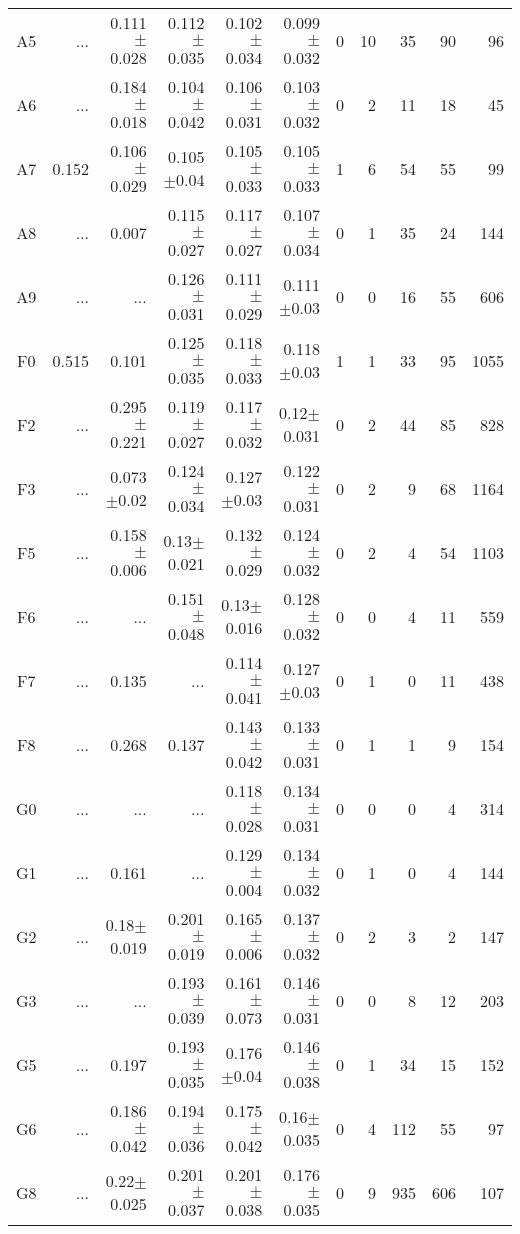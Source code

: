 \begin{table}[t]
\begin{center}
\begin{tabular}{c|rrrrr|rrrrr}
A5	&	 ...	&	0.111$\pm$0.028	&	0.112$\pm$0.035	&	0.102$\pm$0.034	&	0.099$\pm$0.032	&	0	&	10	&	35	&	90	&	96	\\
A6	&	 ...	&	0.184$\pm$0.018	&	0.104$\pm$0.042	&	0.106$\pm$0.031	&	0.103$\pm$0.032	&	0	&	2	&	11	&	18	&	45	\\
A7	&	0.152	&	0.106$\pm$0.029	&	0.105$\pm$0.04	&	0.105$\pm$0.033	&	0.105$\pm$0.033	&	1	&	6	&	54	&	55	&	99	\\
A8	&	 ...	&	0.007	&	0.115$\pm$0.027	&	0.117$\pm$0.027	&	0.107$\pm$0.034	&	0	&	1	&	35	&	24	&	144	\\
A9	&	 ...	&	 ...	&	0.126$\pm$0.031	&	0.111$\pm$0.029	&	0.111$\pm$0.03	&	0	&	0	&	16	&	55	&	606	\\
F0	&	0.515	&	0.101	&	0.125$\pm$0.035	&	0.118$\pm$0.033	&	0.118$\pm$0.03	&	1	&	1	&	33	&	95	&	1055	\\
F2	&	 ...	&	0.295$\pm$0.221	&	0.119$\pm$0.027	&	0.117$\pm$0.032	&	0.12$\pm$0.031	&	0	&	2	&	44	&	85	&	828	\\
F3	&	 ...	&	0.073$\pm$0.02	&	0.124$\pm$0.034	&	0.127$\pm$0.03	&	0.122$\pm$0.031	&	0	&	2	&	9	&	68	&	1164	\\
F5	&	 ...	&	0.158$\pm$0.006	&	0.13$\pm$0.021	&	0.132$\pm$0.029	&	0.124$\pm$0.032	&	0	&	2	&	4	&	54	&	1103	\\
F6	&	 ...	&	 ...	&	0.151$\pm$0.048	&	0.13$\pm$0.016	&	0.128$\pm$0.032	&	0	&	0	&	4	&	11	&	559	\\
F7	&	 ...	&	0.135	&	 ...	&	0.114$\pm$0.041	&	0.127$\pm$0.03	&	0	&	1	&	0	&	11	&	438	\\
F8	&	 ...	&	0.268	&	0.137	&	0.143$\pm$0.042	&	0.133$\pm$0.031	&	0	&	1	&	1	&	9	&	154	\\
G0	&	 ...	&	 ...	&	 ...	&	0.118$\pm$0.028	&	0.134$\pm$0.031	&	0	&	0	&	0	&	4	&	314	\\
G1	&	 ...	&	0.161	&	 ...	&	0.129$\pm$0.004	&	0.134$\pm$0.032	&	0	&	1	&	0	&	4	&	144	\\
G2	&	 ...	&	0.18$\pm$0.019	&	0.201$\pm$0.019	&	0.165$\pm$0.006	&	0.137$\pm$0.032	&	0	&	2	&	3	&	2	&	147	\\
G3	&	 ...	&	 ...	&	0.193$\pm$0.039	&	0.161$\pm$0.073	&	0.146$\pm$0.031	&	0	&	0	&	8	&	12	&	203	\\
G5	&	 ...	&	0.197	&	0.193$\pm$0.035	&	0.176$\pm$0.04	&	0.146$\pm$0.038	&	0	&	1	&	34	&	15	&	152	\\
G6	&	 ...	&	0.186$\pm$0.042	&	0.194$\pm$0.036	&	0.175$\pm$0.042	&	0.16$\pm$0.035	&	0	&	4	&	112	&	55	&	97	\\
G8	&	 ...	&	0.22$\pm$0.025	&	0.201$\pm$0.037	&	0.201$\pm$0.038	&	0.176$\pm$0.035	&	0	&	9	&	935	&	606	&	107	\\

\end{tabular}
\end{center}
\end{table}
